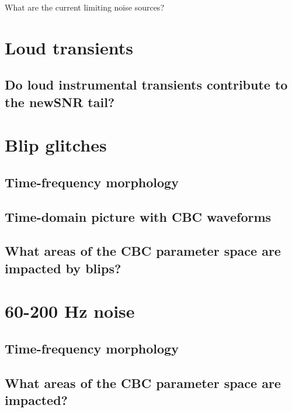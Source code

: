 What are the current limiting noise sources?

\section{Loud transients}

\subsection{Do loud instrumental transients contribute to the newSNR tail?}

\section{Blip glitches}

\subsection{Time-frequency morphology}

\subsection{Time-domain picture with CBC waveforms}

\subsection{What areas of the CBC parameter space are impacted by blips?}

\section{60-200 Hz noise}

\subsection{Time-frequency morphology}

\subsection{What areas of the CBC parameter space are impacted?}


